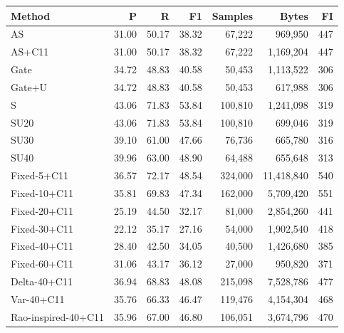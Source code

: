 \setlength{\tabcolsep}{3pt}\begin{tabular}{lrrrrrr}\toprule
Method & P & R & F1 & Samples & Bytes & FI \\\midrule
AS & 31.00 & 50.17 & 38.32 & 67,222 & 969,950 & 447 \\
AS+C11 & 31.00 & 50.17 & 38.32 & 67,222 & 1,169,204 & 447 \\
Gate & 34.72 & 48.83 & 40.58 & 50,453 & 1,113,522 & 306 \\
Gate+U & 34.72 & 48.83 & 40.58 & 50,453 & 617,988 & 306 \\
S & 43.06 & 71.83 & 53.84 & 100,810 & 1,241,098 & 319 \\
SU20 & 43.06 & 71.83 & 53.84 & 100,810 & 699,046 & 319 \\
SU30 & 39.10 & 61.00 & 47.66 & 76,736 & 665,780 & 316 \\
SU40 & 39.96 & 63.00 & 48.90 & 64,488 & 655,648 & 313 \\
Fixed-5+C11 & 36.57 & 72.17 & 48.54 & 324,000 & 11,418,840 & 540 \\
Fixed-10+C11 & 35.81 & 69.83 & 47.34 & 162,000 & 5,709,420 & 551 \\
Fixed-20+C11 & 25.19 & 44.50 & 32.17 & 81,000 & 2,854,260 & 441 \\
Fixed-30+C11 & 22.12 & 35.17 & 27.16 & 54,000 & 1,902,540 & 418 \\
Fixed-40+C11 & 28.40 & 42.50 & 34.05 & 40,500 & 1,426,680 & 385 \\
Fixed-60+C11 & 31.06 & 43.17 & 36.12 & 27,000 & 950,820 & 371 \\
Delta-40+C11 & 36.94 & 68.83 & 48.08 & 215,098 & 7,528,786 & 477 \\
Var-40+C11 & 35.76 & 66.33 & 46.47 & 119,476 & 4,154,304 & 468 \\
Rao-inspired-40+C11 & 35.96 & 67.00 & 46.80 & 106,051 & 3,674,796 & 470 \\
\bottomrule\end{tabular}
